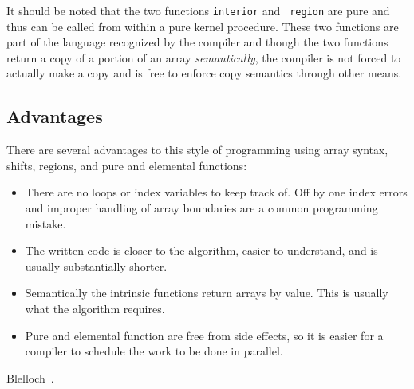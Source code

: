 It should be noted that the two functions {\tt interior} and {\tt
  region} are pure and thus can be called from within a pure kernel
procedure.  These two functions are part of the language recognized by
the compiler and though the two functions return a copy of a portion
of an array \emph{semantically}, the compiler is not forced to
actually make a copy and is free to enforce copy semantics through
other means.

\subsection{Advantages}

There are several advantages to this style of programming using array
syntax, shifts, regions, and pure and elemental functions:

\begin{itemize}
\item There are no loops or index variables to keep track of.  Off by
  one index errors and improper handling of array boundaries are a
  common programming mistake.
\item The written code is closer to the algorithm, easier to
  understand, and is usually substantially shorter.
\item Semantically the intrinsic functions return arrays by value.
  This is usually what the algorithm requires.
\item Pure and elemental function are free from side effects, so it is
  easier for a compiler to schedule the work to be done in parallel.
\end{itemize}


%


Blelloch~\cite{blelloch90,rajopadhye93}.


